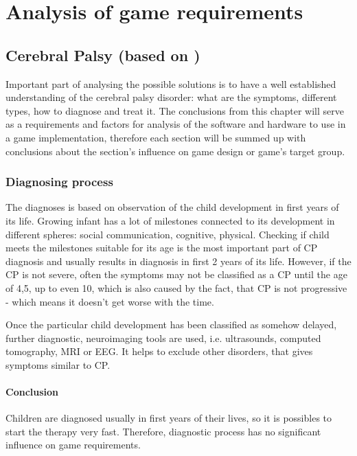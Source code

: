 \chapter{Analysis of game requirements}

\section[Cerebral Palsy]{Cerebral Palsy (based on \cite{main_site, stats, WebMD, MedicineNet, CerebralPalsy})}
Important part of analysing the possible solutions is to have a well established understanding of the cerebral palsy disorder: what are the symptoms, different types, how to diagnose and treat it. The conclusions from this chapter will serve as a requirements and factors for analysis of the software and hardware to use in a game implementation, therefore each section will be summed up with conclusions about the section's influence on game design or game's target group.

\subsection{Diagnosing process}
The diagnoses is based on observation of the child development in first years of its life. Growing infant has a lot of milestones connected to its development in different spheres: social communication, cognitive, physical. Checking if child meets the milestones suitable for its age is the most important part of CP diagnosis and usually results in diagnosis in first 2 years of its life. However, if the CP is not severe, often the symptoms may not be classified as a CP until the age of 4,5, up to even 10, which is also caused by the fact, that CP is not progressive - which means it doesn't get worse with the time. 

Once the particular child development has been classified as somehow delayed, further diagnostic, neuroimaging tools are used, i.e. ultrasounds, computed tomography, MRI or EEG. It helps to exclude other disorders, that gives symptoms similar to CP.
\subsubsection*{Conclusion}
Children are diagnosed usually in first years of their lives, so it is possibles to start the therapy very fast. Therefore, diagnostic process has no significant influence on game requirements. 

